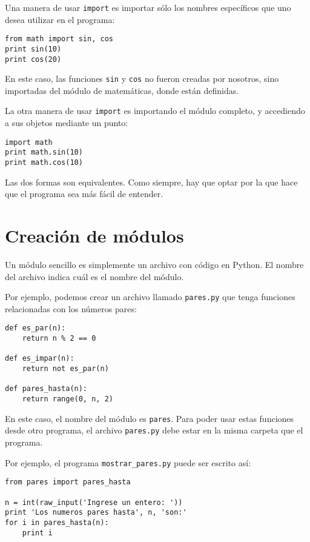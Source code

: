 Una manera de usar \lstinline!import! es importar sólo los nombres
específicos que uno desea utilizar en el programa:

\begin{lstlisting}
from math import sin, cos
print sin(10)
print cos(20)
\end{lstlisting}

En este caso, las funciones \lstinline!sin! y \lstinline!cos! no fueron
creadas por nosotros, sino importadas del módulo de matemáticas, donde
están definidas.

La otra manera de usar \lstinline!import! es importando el módulo
completo, y accediendo a sus objetos mediante un punto:

\begin{lstlisting}
import math
print math.sin(10)
print math.cos(10)
\end{lstlisting}

Las dos formas son equivalentes. Como siempre, hay que optar por la que
hace que el programa sea más fácil de entender.

\section{Creación de módulos}

Un módulo sencillo es simplemente un archivo con código en Python. El
nombre del archivo indica cuál es el nombre del módulo.

Por ejemplo, podemos crear un archivo llamado \lstinline!pares.py! que
tenga funciones relacionadas con los números pares:

\begin{lstlisting}
def es_par(n):
    return n % 2 == 0

def es_impar(n):
    return not es_par(n)

def pares_hasta(n):
    return range(0, n, 2)
\end{lstlisting}

En este caso, el nombre del módulo es \lstinline!pares!. Para poder usar
estas funciones desde otro programa, el archivo \lstinline!pares.py!
debe estar en la misma carpeta que el programa.

Por ejemplo, el programa \lstinline!mostrar_pares.py! puede ser escrito
así:

\begin{lstlisting}
from pares import pares_hasta

n = int(raw_input('Ingrese un entero: '))
print 'Los numeros pares hasta', n, 'son:'
for i in pares_hasta(n):
    print i
\end{lstlisting}

